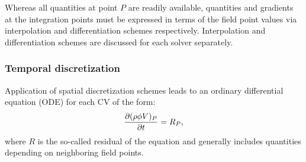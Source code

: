 Whereas all quantities at point $P$ are readily available, quantities and gradients at the integration points must be expressed in terms of the field point values via interpolation and differentiation schemes respectively. Interpolation and differentiation schemes are discussed for each solver separately. 

\subsubsection{Temporal discretization}
Application of spatial discretization schemes leads to an ordinary differential equation (ODE) for each CV of the form:
\begin{equation}
     \frac{\partial (\rho\phi V)_P}{\partial t}  = R_P
    \label{eq:temp1},
\end{equation}
where $R$ is the so-called residual of the equation and generally includes quantities depending on neighboring field points. 

